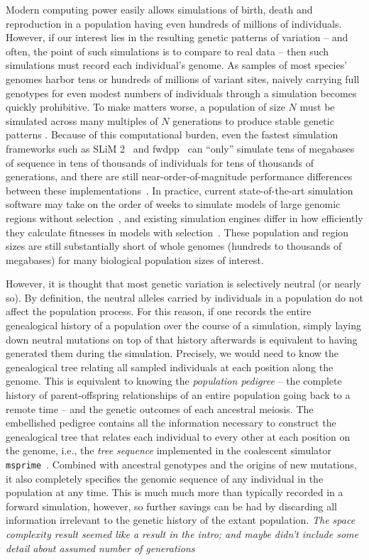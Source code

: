 \documentclass{article}
\newcommand{\msprime}{\texttt{msprime}}
\newcommand{\jda}[1]{{\em \color{cyan} #1}}
\begin{document}
Modern computing power easily allows simulations of birth, death and reproduction
in a population having even hundreds of millions of individuals.
However, if our interest lies in the resulting genetic patterns of variation
-- and often, the point of such simulations is to compare to real data --
then such simulations must record each individual's genome.
As samples of most species' genomes harbor tens or hundreds of millions of variant sites,
naively carrying full genotypes for even modest numbers of individuals through a simulation
becomes quickly prohibitive.
To make matters worse,
a population of size $N$ must be simulated across many multiples of $N$ generations
to produce stable genetic patterns \citep{wright1931evolution, wakeley2005coalescent}.
Because of this computational burden, even the fastest simulation frameworks such as
SLiM 2~\citep{haller2017flexible} and fwdpp~\citep{fwdpp}
can ``only'' simulate tens of megabases of sequence in tens of thousands of individuals
for tens of thousands of generations, and there are still near-order-of-magnitude performance differences between these
implementations~\citep{haller2017flexible}.
In practice, current state-of-the-art simulation software may take on the order of
weeks to simulate models of large genomic regions without selection~\citep{fwdpp,Hernandez2015-wf},
and existing simulation engines differ in how efficiently they
calculate fitnesses in models with selection~\citep{fwdpp}.
These population and region sizes are still substantially short of whole genomes
(hundreds to thousands of megabases)
for many biological population sizes of interest.

However, it is thought that most genetic variation is selectively neutral (or nearly so).
By definition, the neutral alleles carried by individuals in a population
do not affect the population process.
For this reason, if one records the entire genealogical history of a population over the course of a simulation,
simply laying down neutral mutations on top of that history afterwards
is equivalent to having generated them during the simulation.
Precisely, we would need to know the genealogical tree relating all sampled individuals
at each position along the genome.
This is equivalent to knowing the \emph{population pedigree} --
the complete history of parent-offspring relationships of an entire population
going back to a remote time -- and the genetic outcomes of each ancestral
meiosis.
The embellished pedigree contains all the information necessary
to construct the genealogical tree that relates each individual to every other
at each position on the genome,
i.e., the \emph{tree sequence} implemented in the coalescent simulator \msprime{}~\citep{kelleher2016efficient}.
Combined with ancestral genotypes and the origins of new mutations,
it also completely specifies the genomic sequence of any individual in the population at any time.
This is much much more than typically recorded in a forward simulation, however,
so further savings can be had by discarding all information irrelevant to the genetic history
of the extant population.
\jda{The space complexity result seemed like a result in the intro; and maybe didn't include some detail
	about assumed number of generations}
\end{document}
